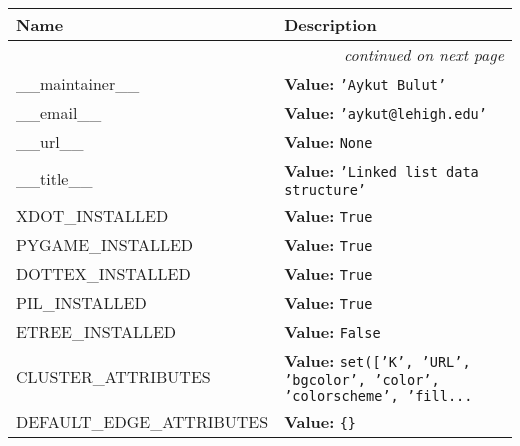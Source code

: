     \vspace{-1cm}
\hspace{\varindent}\begin{longtable}{|p{\varnamewidth}|p{\vardescrwidth}|l}
\cline{1-2}
\cline{1-2} \centering \textbf{Name} & \centering \textbf{Description}& \\
\cline{1-2}
\endhead\cline{1-2}\multicolumn{3}{r}{\small\textit{continued on next page}}\\\endfoot\cline{1-2}
\endlastfoot\raggedright \_\-\_\-m\-a\-i\-n\-t\-a\-i\-n\-e\-r\-\_\-\_\- & \raggedright \textbf{Value:} 
{\tt \texttt{'}\texttt{Aykut Bulut}\texttt{'}}&\\
\cline{1-2}
\raggedright \_\-\_\-e\-m\-a\-i\-l\-\_\-\_\- & \raggedright \textbf{Value:} 
{\tt \texttt{'}\texttt{aykut@lehigh.edu}\texttt{'}}&\\
\cline{1-2}
\raggedright \_\-\_\-u\-r\-l\-\_\-\_\- & \raggedright \textbf{Value:} 
{\tt None}&\\
\cline{1-2}
\raggedright \_\-\_\-t\-i\-t\-l\-e\-\_\-\_\- & \raggedright \textbf{Value:} 
{\tt \texttt{'}\texttt{Linked list data structure}\texttt{'}}&\\
\cline{1-2}
\raggedright X\-D\-O\-T\-\_\-I\-N\-S\-T\-A\-L\-L\-E\-D\- & \raggedright \textbf{Value:} 
{\tt True}&\\
\cline{1-2}
\raggedright P\-Y\-G\-A\-M\-E\-\_\-I\-N\-S\-T\-A\-L\-L\-E\-D\- & \raggedright \textbf{Value:} 
{\tt True}&\\
\cline{1-2}
\raggedright D\-O\-T\-2\-T\-E\-X\-\_\-I\-N\-S\-T\-A\-L\-L\-E\-D\- & \raggedright \textbf{Value:} 
{\tt True}&\\
\cline{1-2}
\raggedright P\-I\-L\-\_\-I\-N\-S\-T\-A\-L\-L\-E\-D\- & \raggedright \textbf{Value:} 
{\tt True}&\\
\cline{1-2}
\raggedright E\-T\-R\-E\-E\-\_\-I\-N\-S\-T\-A\-L\-L\-E\-D\- & \raggedright \textbf{Value:} 
{\tt False}&\\
\cline{1-2}
\raggedright C\-L\-U\-S\-T\-E\-R\-\_\-A\-T\-T\-R\-I\-B\-U\-T\-E\-S\- & \raggedright \textbf{Value:} 
{\tt \texttt{set([}\texttt{'}\texttt{K}\texttt{'}\texttt{, }\texttt{'}\texttt{URL}\texttt{'}\texttt{, }\texttt{'}\texttt{bgcolor}\texttt{'}\texttt{, }\texttt{'}\texttt{color}\texttt{'}\texttt{, }\texttt{'}\texttt{colorscheme}\texttt{'}\texttt{, }\texttt{'}\texttt{fill}\texttt{...}}&\\
\cline{1-2}
\raggedright D\-E\-F\-A\-U\-L\-T\-\_\-E\-D\-G\-E\-\_\-A\-T\-T\-R\-I\-B\-U\-T\-E\-S\- & \raggedright \textbf{Value:} 
{\tt \texttt{\{}\texttt{\}}}&\\

\end{longtable}
